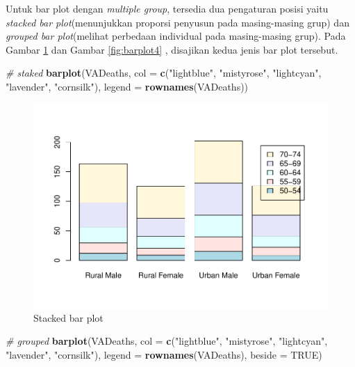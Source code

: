 \documentclass[]{book}
\newenvironment{Shaded}{\begin{snugshade}}{\end{snugshade}}
\newcommand{\KeywordTok}[1]{\textcolor[rgb]{0.13,0.29,0.53}{\textbf{#1}}}
\newcommand{\DataTypeTok}[1]{\textcolor[rgb]{0.13,0.29,0.53}{#1}}
\newcommand{\StringTok}[1]{\textcolor[rgb]{0.31,0.60,0.02}{#1}}
\newcommand{\CommentTok}[1]{\textcolor[rgb]{0.56,0.35,0.01}{\textit{#1}}}
\newcommand{\OtherTok}[1]{\textcolor[rgb]{0.56,0.35,0.01}{#1}}
\newcommand{\NormalTok}[1]{#1}
\begin{document}
Untuk bar plot dengan \emph{multiple group}, tersedia dua pengaturan
posisi yaitu \emph{stacked bar plot}(menunjukkan proporsi penyusun pada
masing-masing grup) dan \emph{grouped bar plot}(melihat perbedaan
individual pada masing-masing grup). Pada Gambar \ref{fig:barplot3} dan
Gambar \ref{fig:barplot4} , disajikan kedua jenis bar plot tersebut.

\begin{Shaded}
\begin{Highlighting}[]
\CommentTok{# staked}
\KeywordTok{barplot}\NormalTok{(VADeaths,}
         \DataTypeTok{col =} \KeywordTok{c}\NormalTok{(}\StringTok{"lightblue"}\NormalTok{, }\StringTok{"mistyrose"}\NormalTok{, }\StringTok{"lightcyan"}\NormalTok{, }
                 \StringTok{"lavender"}\NormalTok{, }\StringTok{"cornsilk"}\NormalTok{),}
        \DataTypeTok{legend =} \KeywordTok{rownames}\NormalTok{(VADeaths))}
\end{Highlighting}
\end{Shaded}

\begin{figure}

{\centering \includegraphics[width=0.7\linewidth]{EnvStat_files/figure-latex/barplot3-1} 

}

\caption{Stacked bar plot}\label{fig:barplot3}
\end{figure}

\begin{Shaded}
\begin{Highlighting}[]
\CommentTok{# grouped}
\KeywordTok{barplot}\NormalTok{(VADeaths,}
         \DataTypeTok{col =} \KeywordTok{c}\NormalTok{(}\StringTok{"lightblue"}\NormalTok{, }\StringTok{"mistyrose"}\NormalTok{, }\StringTok{"lightcyan"}\NormalTok{, }
                 \StringTok{"lavender"}\NormalTok{, }\StringTok{"cornsilk"}\NormalTok{),}
        \DataTypeTok{legend =} \KeywordTok{rownames}\NormalTok{(VADeaths), }\DataTypeTok{beside =} \OtherTok{TRUE}\NormalTok{)}
\end{Highlighting}
\end{Shaded}
\end{document}
